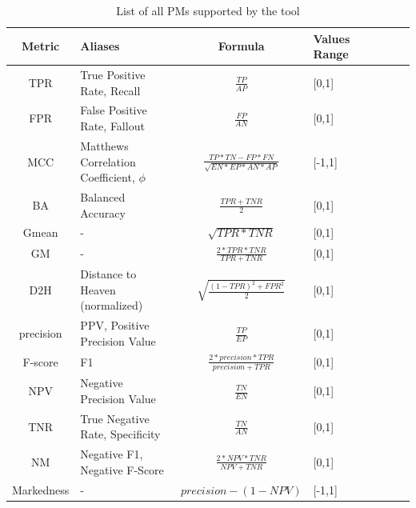 \documentclass{article}
\begin{document}
	\begin{table}[h!]
		\label{tab:PMlist}
		\centering
		\caption{List of all PMs supported by the tool}
		\begin{tabular}{SlSlSlSl}
			\hline
			\textbf{Metric} & \textbf{Aliases}                      & \textbf{Formula} & \textbf{Values Range} \\ \hline
			TPR             & True Positive Rate, Recall            & $\frac{TP}{AP}$                & {[}0,1{]}             \\
			FPR             & False Positive Rate, Fallout          & $\frac{FP}{AN}$                 & {[}0,1{]}             \\
			MCC             & Matthews Correlation Coefficient, $\phi$ & $\frac{TP*TN-FP*FN}{\sqrt{EN*EP*AN*AP}}$                & {[}-1,1{]}            \\
			BA              & Balanced Accuracy                     & $\frac{TPR+TNR}{2}$                & {[}0,1{]}             \\
			Gmean           & -                                     & $\sqrt{TPR*TNR}$                & {[}0,1{]}             \\
			GM              & -                                     & $\frac{2*TPR*TNR}{TPR+TNR}$                & {[}0,1{]}             \\
			D2H             & Distance to Heaven (normalized)                   & $\sqrt{\frac{(1-TPR)^2+FPR^2}{2}}$                & {[}0,1{]}          \\
			precision       & PPV, Positive Precision Value         & $\frac{TP}{EP}$                 & {[}0,1{]}             \\
			F-score         & F1                                    & $\frac{2*precision*TPR}{precision+TPR}$                & {[}0,1{]}             \\
			NPV             & Negative Precision Value              & $\frac{TN}{EN}$                & {[}0,1{]}             \\
			TNR             & True Negative Rate, Specificity       & $\frac{TN}{AN}$                  & {[}0,1{]}             \\
			NM              & Negative F1, Negative F-Score         & $\frac{2*NPV*TNR}{NPV+TNR}$                 & {[}0,1{]}             \\
			Markedness      & -                                     & $precision - (1 - NPV)$                & {[}-1,1{]}            \\ \hline
		\end{tabular}
	\end{table}
	
\end{document}
